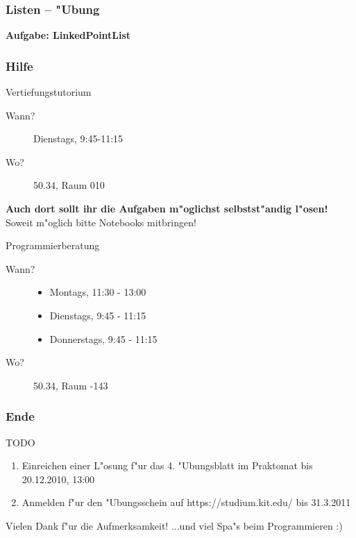 \documentclass{beamer}
\begin{document}
\begin{frame}
\frametitle{Listen -- "Ubung}
\begin{center}
\textbf{\Huge Aufgabe: LinkedPointList}
\end{center}
\end{frame}


\begin{frame}
\frametitle{Hilfe}
\begin{block}{Vertiefungstutorium}
\begin{description}
\item[Wann?] Dienstags, 9:45-11:15
\item[Wo?] 50.34, Raum 010
\end{description}
\textbf{Auch dort sollt ihr die Aufgaben m"oglichst selbstst"andig l"osen!}
\alert{Soweit m"oglich bitte Notebooks mitbringen!}
\end{block}

\begin{block}{Programmierberatung}
\begin{description}
\item[Wann?]
\begin{itemize}
\item Montags, 11:30 - 13:00
\item Dienstags, 9:45 - 11:15
\item Donnerstags, 9:45 - 11:15
\end{itemize}
\item[Wo?] 50.34, Raum -143
\end{description}
\end{block}
\end{frame}


\begin{frame}
\frametitle{Ende}
\begin{block}{TODO}
\begin{enumerate}
\item Einreichen einer L"osung f"ur das 4. "Ubungsblatt im Praktomat bis \alert{20.12.2010, 13:00}
\item Anmelden f"ur den "Ubungsschein auf https://studium.kit.edu/ bis \alert{31.3.2011}
\end{enumerate}
\end{block}

\begin{block}{Vielen Dank f"ur die Aufmerksamkeit!}
...und viel Spa"s beim Programmieren :)
\end{block}
\end{frame}
\end{document}
